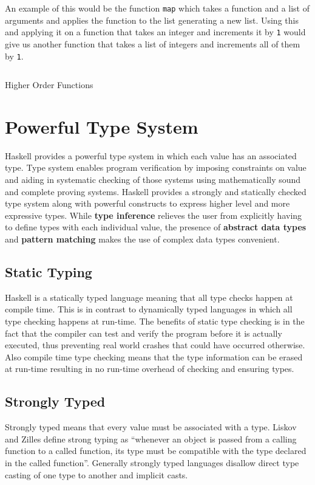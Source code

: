 An example of this would be the function \texttt{map} which takes a function and a list of arguments and applies the function to the list
generating a new list. Using this and applying it on a function that takes an integer and increments it by \texttt{1} would give us another
function that takes a list of integers and increments all of them by \texttt{1}.

\begin{listing}
\inputminted{haskell}{hs/higher_order.hs}
\caption{Higher Order Functions}
\end{listing}

\section{Powerful Type System}
Haskell provides a powerful type system in which each value has an associated type.
Type system enables program verification by imposing constraints on value and aiding in systematic checking of those systems using mathematically
sound and complete proving systems.
Haskell provides a strongly and statically checked type system along with powerful constructs to express higher level and more expressive types.
While \textbf{type inference} relieves the user from explicitly having to define types with each individual value,
the presence of \textbf{abstract data types} and \textbf{pattern matching} makes the use of complex data types convenient.

\subsection{Static Typing}
Haskell is a statically typed language meaning that all type checks happen at compile time. This is in contrast to dynamically typed languages
in which all type checking happens at run-time. The benefits of static type checking is in the fact that the compiler can test and verify the
program before it is actually executed, thus preventing real world crashes that could have occurred otherwise.
Also compile time type checking means that the type information can be erased at run-time resulting in no run-time overhead of checking
and ensuring types.

\subsection{Strongly Typed}
Strongly typed means that every value must be associated with a type.
Liskov and Zilles define strong typing as ``whenever an object is passed from a calling function to a called function,
 its type must be compatible with the type declared in the called function''\cite{LZ74}.
Generally strongly typed languages disallow direct type casting of one type to another and implicit casts.

